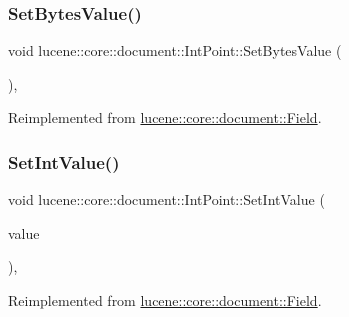 \subsubsection{\texorpdfstring{Set\+Bytes\+Value()}{SetBytesValue()}}
{\footnotesize\ttfamily void lucene\+::core\+::document\+::\+Int\+Point\+::\+Set\+Bytes\+Value (\begin{DoxyParamCaption}\item[{const \mbox{\hyperlink{classlucene_1_1core_1_1util_1_1BytesRef}{lucene\+::core\+::util\+::\+Bytes\+Ref}} \&}]{ }\end{DoxyParamCaption})\hspace{0.3cm}{\ttfamily [inline]}, {\ttfamily [virtual]}}



Reimplemented from \mbox{\hyperlink{classlucene_1_1core_1_1document_1_1Field_a41d077e63ce6fae8677b8df6b29821bd}{lucene\+::core\+::document\+::\+Field}}.

\mbox{\label{classlucene_1_1core_1_1document_1_1IntPoint_a49cd2286ec4ffa46d868eea812d85234}} 
\subsubsection{\texorpdfstring{Set\+Int\+Value()}{SetIntValue()}}
{\footnotesize\ttfamily void lucene\+::core\+::document\+::\+Int\+Point\+::\+Set\+Int\+Value (\begin{DoxyParamCaption}\item[{const int32\+\_\+t}]{value }\end{DoxyParamCaption})\hspace{0.3cm}{\ttfamily [inline]}, {\ttfamily [virtual]}}



Reimplemented from \mbox{\hyperlink{classlucene_1_1core_1_1document_1_1Field_a6aee080f0bf507f8c6a5cfc64bd913a2}{lucene\+::core\+::document\+::\+Field}}.

\mbox{\label{classlucene_1_1core_1_1document_1_1IntPoint_a880e94ed4c6162b469cc23846ea8bc2e}} 
